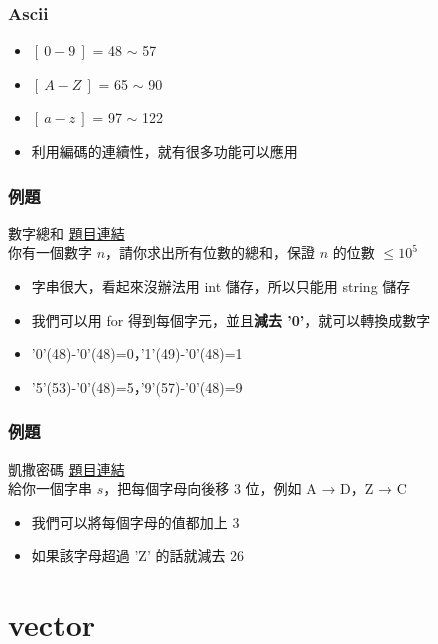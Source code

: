 \documentclass[mathserif]{beamer}
\begin{document}
\begin{frame}
    \frametitle{Ascii}
    \begin{itemize}
        \item $[\ 0-9\ ]$ = 48 $\sim$ 57
        \item $[\ A-Z\ ]$ = 65 $\sim$ 90
        \item $[\ a-z\ ]$ = 97 $\sim$ 122
        \item 利用編碼的連續性，就有很多功能可以應用
    \end{itemize}
\end{frame}

\begin{frame}
    \frametitle{例題}
    \begin{block}{數字總和}
        \href{https://codeforces.com/group/S6XjkGb6qB/contest/403070/problem/C}{題目連結}\\
        你有一個數字 $n$，請你求出所有位數的總和，保證 $n$ 的位數 $\leq 10^5$
    \end{block}
    \begin{itemize}
        \item<2-> 字串很大，看起來沒辦法用 int 儲存，所以只能用 string 儲存
        \item<2-> 我們可以用 for 得到每個字元，並且\textbf{減去 '0'}，就可以轉換成數字
        \item<2-> '0'(48)-'0'(48)=0，'1'(49)-'0'(48)=1
        \item<2-> '5'(53)-'0'(48)=5，'9'(57)-'0'(48)=9
    \end{itemize}
\end{frame}

\begin{frame}
    \frametitle{例題}
    \begin{block}{凱撒密碼}
        \href{https://zerojudge.tw/ShowProblem?problemid=b516}{題目連結}\\
        給你一個字串 $s$，把每個字母向後移 3 位，例如 A → D，Z → C
    \end{block}
    \begin{itemize}
        \item<2-> 我們可以將每個字母的值都加上 3
        \item<2-> 如果該字母超過 'Z' 的話就減去 26
    \end{itemize}
\end{frame}

\section{vector}
\end{document}
